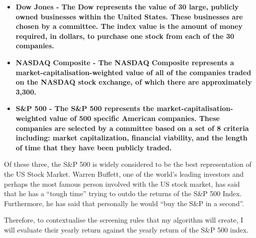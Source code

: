 \begin{itemize}
    \item \bf Dow Jones \rm - The Dow represents the value of 30 large, publicly owned businesses within the United States. These businesses are chosen by a committee. The index value is the amount of money required, in dollars, to purchase one stock from each of the 30 companies.
    \item \bf NASDAQ Composite \rm - The NASDAQ Composite represents a market-capitalisation-weighted value of all of the companies traded on the NASDAQ stock exchange, of which there are approximately 3,300.
    \item \bf S\&P 500 \rm - The S\&P 500 represents the market-capitalisation-weighted value of 500 specific American companies. These companies are selected by a committee based on a set of 8 criteria including:  market capitalization, financial viability, and the length of time that they have been publicly traded.
\end{itemize}

Of these three, the S\&P 500 is widely considered to be the best representation of the US Stock Market. \cite{snp500Best} Warren Buffett, one of the world's leading investors and perhaps the most famous person involved with the US stock market, has said that he has a ``tough time'' trying to outdo the returns of the S\&P 500 Index. Furthermore, he has said that personally he would ``buy the S\&P in a second''. \cite{buffettsnp} \newline

Therefore, to contextualise the screening rules that my algorithm will create, I will evaluate their yearly return against the yearly return of the S\&P 500 index. \newline

